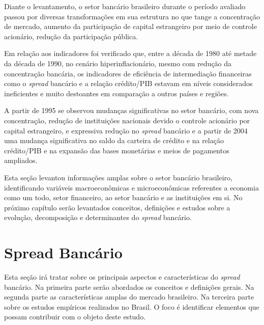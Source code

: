 \documentclass[
  12pt,
  12pt,
  openright,
  oneside,
  a4paper,
  chapter=TITLE,
  section=TITLE,
  subsection=TITLE,
  subsubsection=TITLE,
  english,
  portugues,
  sumario=tradicional]{abntex2}
\begin{document}
Diante o levantamento, o setor bancário brasileiro durante o período avaliado passou por diversas transformações em sua estrutura no que tange a concentração de mercado, aumento da participação de capital estrangeiro por meio de controle acionário, redução da participação pública.

Em relação aos indicadores foi verificado que, entre a década de 1980 até metade da década de 1990, no cenário hiperinflacionário, mesmo com redução da concentração bancária, os indicadores de eficiência de intermediação financeiras como o \emph{spread} bancário e a relação crédito/PIB estavam em níveis considerados ineficientes e muito destoantes em comparação a outros países e regiões.

A partir de 1995 se observou mudanças significativas no setor bancário, com nova concentração, redução de instituições nacionais devido o controle acionário por capital estrangeiro, e expressiva redução no \emph{spread} bancário e a partir de 2004 uma mudança significativa no saldo da carteira de crédito e na relação crédito/PIB e na expansão das bases monetárias e meios de pagamentos ampliados.

Esta seção levantou informações amplas sobre o setor bancário brasileiro, identificando variáveis macroeconômicas e microeconômicas referentes a economia como um todo, setor financeiro, ao setor bancário e as instituições em si. No próximo capítulo serão levantados conceitos, definições e estudos sobre a evolução, decomposição e determinantes do \emph{spread} bancário.

\textual
\pagestyle{simple}
\parindent 1.50cm

\section{Spread Bancário}\label{sec:spread}

Esta seção irá tratar sobre os principais aspectos e características do \emph{spread} bancário. Na primeira parte serão abordados os conceitos e definições gerais. Na segunda parte as características amplas do mercado brasileiro. Na terceira parte sobre os estudos empíricos realizados no Brasil. O foco é identificar elementos que possam contribuir com o objeto deste estudo.

\end{document}

